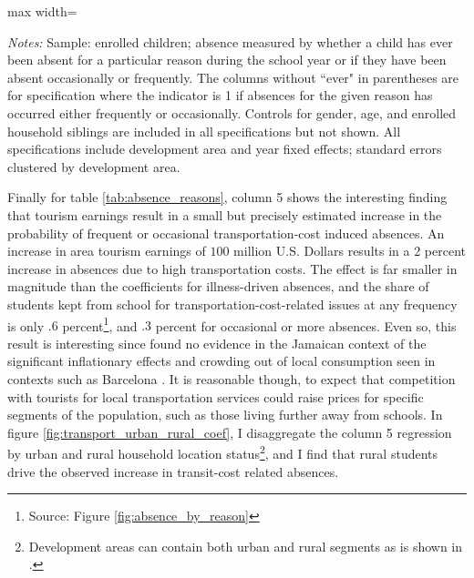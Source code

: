 \documentclass[12pt]{article}
\newcommand*{\TableLagOnePath}{../Paper_3_Tables/Lagged_1Year_Tables}
\renewcommand\footnotesize{\fontsize{11}{13}\selectfont}
\begin{document}
		\begin{table}[h]
		\centering
		\begin{adjustbox}{max width=\textwidth}
		\begin{threeparttable}
			\caption{School Absence Reasons, IV Estimates}
			\label{tab:absence_reasons}
			{\small}
			\begin{tablenotes}
				\small
				\item \textit{Notes:} Sample: enrolled children; absence measured by whether a child has ever been absent for a particular reason during the school year or if they have been absent occasionally or frequently. The columns without ``ever" in parentheses are for specification where the indicator is 1 if absences for the given reason has occurred either frequently or occasionally.  Controls for gender, age, and enrolled household siblings are included in all specifications but not shown. All specifications include development area and year fixed effects; standard errors clustered by development area.
			\end{tablenotes}
		\end{threeparttable}
		\end{adjustbox}
	\end{table}
	
	Finally for table \ref{tab:absence_reasons}, column 5 shows the interesting finding that tourism earnings result in a small but precisely estimated increase in the probability of frequent or occasional transportation-cost induced absences. An increase in area tourism earnings of $100$ million U.S. Dollars results in a 2 percent increase in absences due to high transportation costs. The effect is far smaller in magnitude than the coefficients for illness-driven absences, and the share of students kept from school for transportation-cost-related issues at any frequency is only $.6$ percent\footnote{\footnotesize Source: Figure \ref{fig:absence_by_reason}}, and $.3$ percent for occasional or more absences. Even so, this result is interesting since \textcite{ mcketty_sun_2026} found no evidence in the Jamaican context of the significant inflationary effects and crowding out of local consumption seen in contexts such as Barcelona \parencite{ allen_urban_2021}. It is reasonable though, to expect that competition with tourists for local transportation services could raise prices for specific segments of the population, such as those living further away from schools. In figure \ref{fig:transport_urban_rural_coef}, I disaggregate the column 5 regression by urban and rural household location status\footnote{\footnotesize Development areas can contain both urban and rural segments as is shown in \textcite{ mcketty_sun_2026}.}, and I find that  rural students drive the observed increase in transit-cost related absences. 
\end{document}
